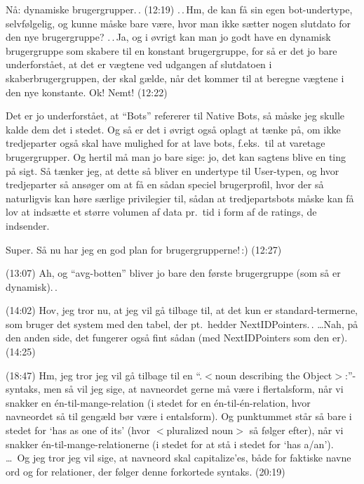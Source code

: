 \documentclass{report}
\begin{document}
Nå: dynamiske brugergrupper.\,. (12:19) .\,.\,Hm, de kan få sin egen bot-undertype, selvfølgelig, og kunne måske bare være, hvor man ikke sætter nogen slutdato for den nye brugergruppe? .\,.\,Ja, og i øvrigt kan man jo godt have en dynamisk brugergruppe som skabere til en konstant brugergruppe, for så er det jo bare underforstået, at det er vægtene ved udgangen af slutdatoen i skaberbrugergruppen, der skal gælde, når det kommer til at beregne vægtene i den nye konstante. Ok! Nemt! (12:22)

Det er jo underforstået, at ``Bots'' refererer til Native Bots, så måske jeg skulle kalde dem det i stedet. Og så er det i øvrigt også oplagt at tænke på, om ikke tredjeparter også skal have mulighed for at lave bots, f.eks.\ til at varetage brugergrupper. Og hertil må man jo bare sige: jo, det kan sagtens blive en ting på sigt. Så tænker jeg, at dette så bliver en undertype til User-typen, og hvor tredjeparter så ansøger om at få en sådan speciel brugerprofil, hvor der så naturligvis kan høre særlige privilegier til, sådan at tredjepartsbots måske kan få lov at indsætte et større volumen af data pr.\ tid i form af de ratings, de indsender. 

Super. Så nu har jeg en god plan for brugergrupperne!\,:) (12:27)

(13:07) Ah, og ``avg-botten'' bliver jo bare den første brugergruppe (som så er dynamisk).\,.

(14:02) Hov, jeg tror nu, at jeg vil gå tilbage til, at det kun er standard-termerne, som bruger det system med den tabel, der pt.\ hedder NextIDPointers.\,. 
%
%
\ldots Nah, på den anden side, det fungerer også fint sådan (med NextIDPointers som den er). (14:25)

(18:47) Hm, jeg tror jeg vil gå tilbage til en ``.$<$noun describing the Object$>$:''-syntaks, men så vil jeg sige, at navneordet gerne må være i flertalsform, når vi snakker en én-til-mange-relation (i stedet for en én-til-én-relation, hvor navneordet så til gengæld bør være i entalsform). Og punktummet står så bare i stedet for `has as one of its' (hvor $<$pluralized noun$>$ så følger efter), når vi snakker én-til-mange-relationerne (i stedet for at stå i stedet for `has a/an'). \ldots\ Og jeg tror jeg vil sige, at navneord skal capitalize'es, både for faktiske navne ord og for relationer, der følger denne forkortede syntaks. (20:19)
\end{document}
